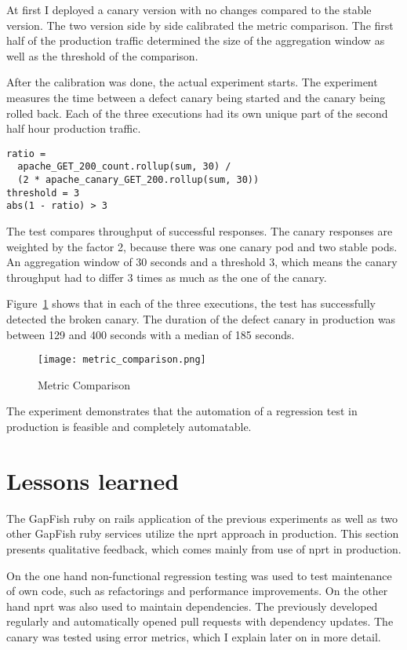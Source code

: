 At first I deployed a canary version with no changes compared to the stable version. The
two version side by side calibrated the metric comparison. The first half of the
production traffic determined the size of the aggregation window as well as the threshold
of the comparison.

After the calibration was done, the actual experiment starts. The experiment measures the
time between a defect canary being started and the canary being rolled back. Each
of the three executions had its own unique part of the second half hour production traffic.

\begin{verbatim}
ratio =
  apache_GET_200_count.rollup(sum, 30) /
  (2 * apache_canary_GET_200.rollup(sum, 30))
threshold = 3
abs(1 - ratio) > 3
\end{verbatim}

The test compares throughput of successful responses. The canary responses are weighted by
the factor 2, because there was one canary pod and two stable pods. An aggregation window
of 30 seconds and a threshold 3, which means the canary throughput had to differ 3 times
as much as the one of the canary.

Figure~\ref{fig:metric_comparison} shows that in each of the three executions, the test
has successfully detected the broken canary. The duration of the defect canary in
production was between 129 and 400 seconds with a median of 185 seconds.

\begin{figure}[htbp]
  \centering
  \texttt{[image: metric\_comparison.png]}
  \caption[Metric Comparison]{Metric Comparison}
  \label{fig:metric_comparison}
\end{figure}

The experiment demonstrates that the automation of a regression test in production is
feasible and completely automatable.

\section{Lessons learned}

The GapFish ruby on rails application of the previous experiments as well as two other
GapFish ruby services utilize the \gls{nprt} approach in production. This section presents
qualitative feedback, which comes mainly from use of \gls{nprt} in production.

On the one hand non-functional regression testing was used to test maintenance of own code,
such as refactorings and performance improvements. On the other hand \gls{nprt} was also
used to maintain dependencies. The previously developed \gemupdater regularly and
automatically opened pull requests with dependency updates. The canary was tested using
error metrics, which I explain later on in more detail.


